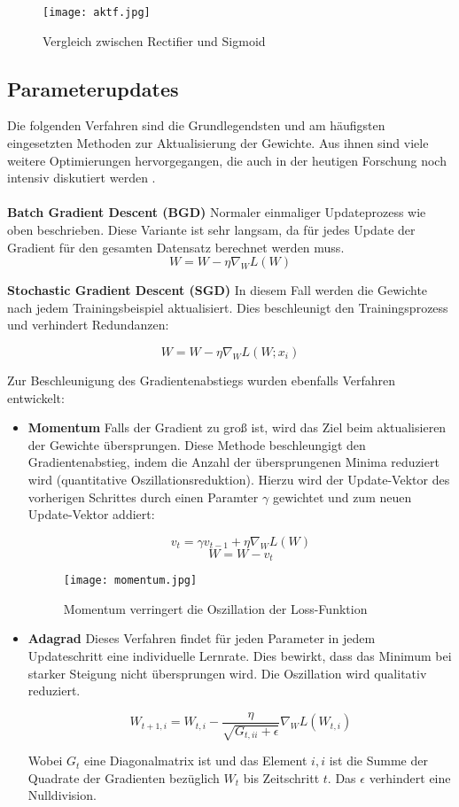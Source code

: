 \documentclass[11pt,ceqn]{book}
\begin{document}
\begin{figure}[H]
\centering
\texttt{[image: aktf.jpg]}
\caption{Vergleich zwischen Rectifier und Sigmoid}
\end{figure}

\subsection{Parameterupdates}
Die folgenden Verfahren sind die Grundlegendsten und am häufigsten eingesetzten Methoden zur Aktualisierung der Gewichte. Aus ihnen sind viele weitere Optimierungen hervorgegangen, die auch in der heutigen Forschung noch intensiv diskutiert werden \cite{gdalg}.\\~\\

\textbf{Batch Gradient Descent (BGD)}
Normaler einmaliger Updateprozess wie oben beschrieben. Diese Variante ist sehr langsam, da für jedes Update der Gradient für den gesamten Datensatz berechnet werden muss.
\[W = W - \eta \nabla_WL(W)\]

\textbf{Stochastic Gradient Descent (SGD)}
In diesem Fall werden die Gewichte nach jedem Trainingsbeispiel aktualisiert. Dies beschleunigt den Trainingsprozess und verhindert Redundanzen:

\[W=W - \eta \nabla_W L(W;x_i)\]

\bigskip
Zur Beschleunigung des Gradientenabstiegs wurden ebenfalls Verfahren entwickelt:
\begin{itemize}
\item \textbf{Momentum} Falls der Gradient zu groß ist, wird das Ziel beim aktualisieren der Gewichte übersprungen. Diese Methode beschleungigt den Gradientenabstieg, indem die Anzahl der übersprungenen Minima reduziert wird (quantitative Oszillationsreduktion). Hierzu wird der Update-Vektor des vorherigen Schrittes durch einen Paramter $\gamma$ gewichtet und zum neuen Update-Vektor addiert:

\[v_t=\gamma v_{t-1}+\eta \nabla_WL(W)\]
\[W=W-v_t\]

\begin{figure}[H]
\centering
\texttt{[image: momentum.jpg]}
\caption{Momentum verringert die Oszillation der Loss-Funktion}
\end{figure}



\item \textbf{Adagrad} Dieses Verfahren findet für jeden Parameter in jedem Updateschritt eine individuelle Lernrate. Dies bewirkt, dass das Minimum bei starker Steigung nicht übersprungen wird. Die Oszillation wird qualitativ reduziert.

\[W_{t+1,i}= W_{t,i} - \frac{\eta}{\sqrt{G_{t,ii}+\epsilon}} \nabla_W L(W_{t,i})\]

Wobei $G_{t}$ eine Diagonalmatrix ist und das Element $i,i$ ist die Summe der Quadrate der Gradienten bezüglich $W_t$ bis Zeitschritt $t$. Das $\epsilon$ verhindert eine Nulldivision.
\end{itemize}
\end{document}
